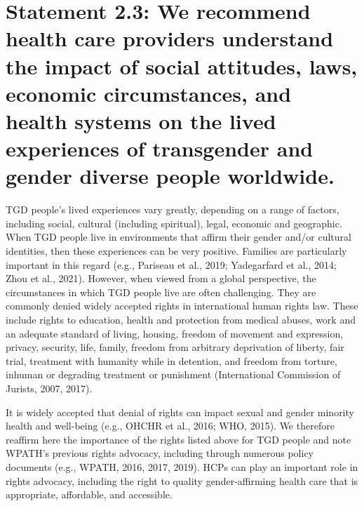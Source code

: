 \documentclass[
]{book}
\begin{document}
\hypertarget{statement-2.3-we-recommend-health-care-providers-understand-the-impact-of-social-attitudes-laws-economic-circumstances-and-health-systems-on-the-lived-experiences-of-transgender-and-gender-diverse-people-worldwide.}{%
\section*{Statement 2.3: We recommend health care providers understand the impact of social attitudes, laws, economic circumstances, and health systems on the lived experiences of transgender and gender diverse people worldwide.}\label{statement-2.3-we-recommend-health-care-providers-understand-the-impact-of-social-attitudes-laws-economic-circumstances-and-health-systems-on-the-lived-experiences-of-transgender-and-gender-diverse-people-worldwide.}}

TGD people's lived experiences vary greatly,
depending on a range of factors, including social,
cultural (including spiritual), legal, economic and
geographic. When TGD people live in environments that affirm their gender and/or cultural
identities, then these experiences can be very
positive. Families are particularly important in
this regard (e.g., Pariseau et al., 2019; Yadegarfard
et al., 2014; Zhou et al., 2021). However, when
viewed from a global perspective, the circumstances in which TGD people live are often challenging. They are commonly denied widely
accepted rights in international human rights law.
These include rights to education, health and
protection from medical abuses, work and an
adequate standard of living, housing, freedom of
movement and expression, privacy, security, life,
family, freedom from arbitrary deprivation of liberty, fair trial, treatment with humanity while in
detention, and freedom from torture, inhuman
or degrading treatment or punishment
(International Commission of Jurists, 2007, 2017).

It is widely accepted that denial of rights can
impact sexual and gender minority health and
well-being (e.g., OHCHR et al., 2016; WHO,
2015). We therefore reaffirm here the importance
of the rights listed above for TGD people and
note WPATH's previous rights advocacy, including through numerous policy documents (e.g.,
WPATH, 2016, 2017, 2019). HCPs can play an
important role in rights advocacy, including the
right to quality gender-affirming health care that
is appropriate, affordable, and accessible.
\end{document}
